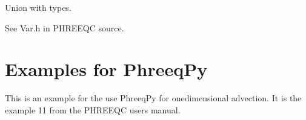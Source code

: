 \documentclass[letterpaper,10pt,english]{sphinxmanual}
\begin{document}

\begin{fulllineitems}
\label{\detokenize{iphreeqc:phreeqpy.iphreeqc.phreeqc_dll.VARUNION}}
Union with types.

See Var.h in PHREEQC source.

\end{fulllineitems}



\chapter{Examples for PhreeqPy}
\label{\detokenize{examples:examples-for-phreeqpy}}\label{\detokenize{examples::doc}}
This is an example for the use PhreeqPy for one\sphinxhyphen{}dimensional advection.
It is the example 11 from the PHREEQC users manual.
\end{document}
